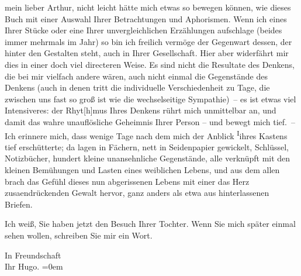 \pstart{}mein lieber Arthur,\pend\vspace{0.5em}
\pstart
           nicht leicht hätte mich etwas so bewegen können, wie dieses Buch mit einer Auswahl Ihrer Betrachtungen und Aphorismen. Wenn
               ich eines Ihrer Stücke oder eine Ihrer unvergleichlichen Erzählungen aufschlage
               (beides immer mehrmals im Jahr) so bin ich freilich vermöge der Gegenwart dessen, der
               hinter den Gestalten steht, auch in Ihrer Gesellschaft. Hier aber widerfährt mir dies
               in einer doch viel directeren Weise. Es sind nicht die Resultate des Denkens, die bei
               mir vielfach andere wären, auch nicht einmal die Gegenstände des Denkens (auch in
               denen tritt die individuelle Verschiedenheit zu Tage, die zwischen uns fast so groß
               ist wie die wechselseitige Sympathie) – {\pb}es ist etwas viel Intensiveres:
               der Rhyt{[}h{]}mus Ihres Denkens rührt mich unmittelbar an, und damit
               das wahre unauflösliche Geheimnis Ihrer Person – und bewegt mich tief. – Ich erinnere
               mich, dass wenige Tage nach dem \label{K_L02496-1v}\label{K_L02496-1} mich der Anblick \substVorne{}\textsuperscript{I}\substDazwischen{}i\substHinten{}hres Kastens tief erschütterte; da lagen in Fächern, nett in Seidenpapier
               gewickelt, Schlüssel, Notizbücher, hundert kleine unansehnliche Gegenstände, alle
               verknüpft mit den kleinen Bemühungen und Lasten eines weiblichen Lebens, und aus dem
               allen brach das Gefühl dieses nun abgerissenen Lebens mit einer das Herz zusa{\geminationm}endrückenden Gewalt hervor, ganz anders als etwa aus
               hinterlassenen Briefen.\pend
           
\pstart
           Ich weiß, Sie haben jetzt den Besuch Ihrer Tochter. Wenn Sie mich später einmal sehen wollen,
               schreiben Sie mir ein Wort.\pend
           
\pstart
           In Freundschaft{\\[\baselineskip]}Ihr \spacefill\mbox{Hugo.}\pend
           \leftskip=0em{}\endnumbering{}  
      